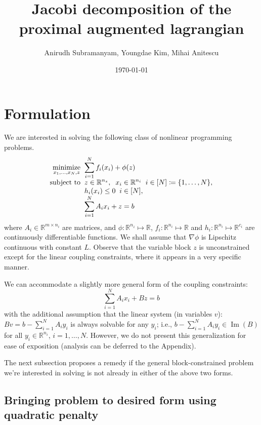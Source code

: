 \documentclass[11pt]{article}
\title{Jacobi decomposition of the proximal augmented lagrangian}
\author{Anirudh Subramanyam, Youngdae Kim, Mihai Anitescu}
\date{\today}
\newcommand{\Image}[1]{\mathop{\text{Im}}\left(#1\right)}
\begin{document}
\maketitle

\section{Formulation}
We are interested in solving the following class of nonlinear programming problems.
\begin{equation}\label{eq:nlp}
\begin{array}{r@{\;\;}l}
\displaystyle\mathop{\text{minimize}}_{x_1, \ldots, x_N, z} & \displaystyle \sum_{i = 1}^N f_i(x_i) + \phi(z) \\
\text{subject to} & \displaystyle z \in \mathbb{R}^{n_z}, \;\; x_i \in \mathbb{R}^{n_i} \;\; i \in [N] \coloneqq \{1, \ldots, N\}, \\
& \displaystyle h_i(x_i) \leq 0 \;\; i \in [N], \\
& \displaystyle \sum_{i = 1}^N A_i x_i + z = b
\end{array}
\end{equation}
where $A_i \in \mathbb{R}^{m \times n_i}$ are matrices, and $\phi : \mathbb{R}^{n_z} \mapsto \mathbb{R}$, $f_i: \mathbb{R}^{n_i} \mapsto \mathbb{R}$ and $h_i :\mathbb{R}^{n_i} \mapsto \mathbb{R}^{c_i}$ are continuously differentiable functions. %
We shall assume that $\nabla \phi$ is Lipschitz continuous with constant $L$.
Observe that the variable block $z$ is unconstrained except for the linear coupling constraints, where it appears in a very specific manner.

We can accommodate a slightly more general form of the coupling constraints:
\[
\sum_{i = 1}^N A_i x_i + B z = b
\]
with the additional assumption that the linear system (in variables $v$): $B v = b - \sum_{i = 1}^{N} A_i y_i$ is always solvable for any $y_i$; i.e., $b - \sum_{i = 1}^{N} A_i y_i \in \Image{B}$ for all $y_i \in \mathbb{R}^{n_i}$,  $i = 1, \ldots, N$.
However, we do not present this generalization for ease of exposition (analysis can be deferred to the Appendix).

The next subsection proposes a remedy if the general block-constrained problem we're interested in solving is not already in either of the above two forms.

\subsection{Bringing problem to desired form using quadratic penalty}
\end{document}
